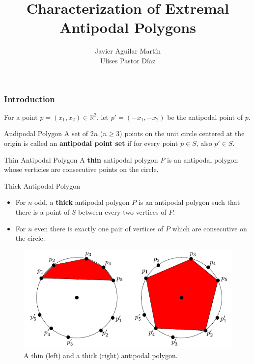 \documentclass{beamer}
\title{Characterization of Extremal Antipodal Polygons}
\author{Javier Aguilar Martín\\ Ulises Pastor Díaz}
\institute{Universidad de Sevilla}
\newcommand{\R}{\mathbb{R}}
\begin{document}
\frame{\titlepage}

\begin{frame}
\frametitle{Introduction}

For a point $p=(x_1,x_2)\in\R^2$, let $p'=(-x_1,-x_2)$ be the antipodal point of $p$.\pause

\begin{block}{Andipodal Polygon}
A set of $2n$ ($n\geq 3$) points on the unit circle centered at the origin is called an \textbf{antipodal point set} if for every point $p\in S$, also $p'\in S$.
\end{block}\pause 

\begin{block}{Thin Antipodal Polygon}
A \textbf{thin} antipodal polygon $P$ is an antipodal polygon whose verticies are consecutive points on the circle.
\end{block}

\end{frame}

\begin{frame}
\begin{block}{Thick Antipodal Polygon}
\begin{itemize}
\item<1-> For $n$ odd, a \textbf{thick} antipodal polygon $P$ is an antipodal polygon such that there is a point of $S$ between every two vertices of $P$. 
\item<2-> For $n$ even there is exactly one pair of vertices of $P$ which are consecutive on the circle. 
\end{itemize}
\end{block}
\end{frame}

\begin{frame}
\begin{figure}[h!]
\centering
\includegraphics[scale=0.7]{fig1}
\caption{A thin (left) and a thick (right) antipodal polygon.}
\end{figure}
\end{frame}
\end{document}
